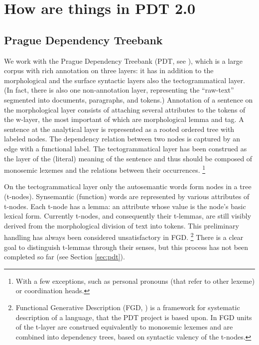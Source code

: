 \chapter{How are things in PDT 2.0}\label{PDT}
\label{sec:pdt}
\section{Prague Dependency Treebank}
\label{sec:pdt/pdt}
We work with the Prague Dependency Treebank (PDT, see \citealp{hajic:2005}), which is a large corpus with rich annotation on three layers: it has in addition to the morphological and the surface syntactic layers also the tectogrammatical layer.
(In fact, there is also one non-annotation layer, representing the ``raw-text'' segmented into documents, paragraphs, and tokens.)
Annotation of a sentence on the morphological layer consists of attaching several attributes to the tokens of the w-layer, the most important of which are morphological lemma and tag.
A sentence at the analytical layer is represented as a rooted ordered tree with labeled nodes. The dependency relation between two nodes is captured by an edge with a functional label.
The tectogrammatical layer has been construed as the layer of the (literal) meaning of the sentence and thus should be composed of monosemic lexemes and the relations between their occurrences.%
\footnote{With a few exceptions, such as personal pronouns (that refer to other lexeme) or coordination heads.}

On the tectogrammatical layer only the autosemantic words form nodes in a tree (t-nodes). Synsemantic (function) words are represented by various attributes of t-nodes. Each t-node has a lemma: an attribute whose value is the node's basic lexical form.
Currently t-nodes, and consequently their t-lemmas, are still visibly derived from the morphological division of text into tokens. This preliminary handling has always been considered unsatisfactory in FGD.%
\footnote{Functional Generative Description (FGD, \citealp{sgall-etal:1986,hajicova:1998}) is a framework for systematic description of a language, that the PDT project is based upon. In FGD units of the t-layer are construed equivalently to monosemic lexemes and are combined into dependency trees, based on syntactic valency of the t-nodes.}
There is a clear goal to distinguish t-lemmas through their senses, but %
this process has not been completed so far (see Section \ref{sec:pdt}).


